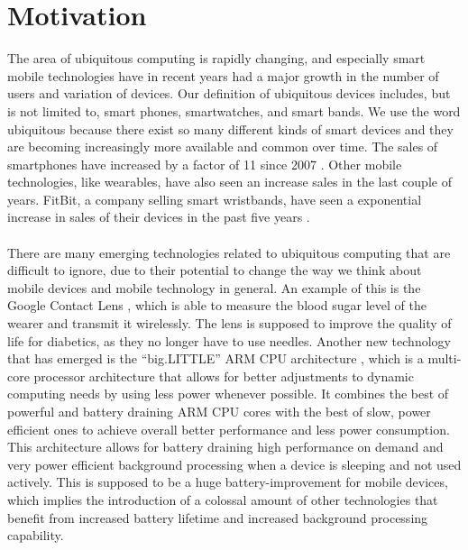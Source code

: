 
\chapter{Motivation}
\label{cha:motivation}

The area of ubiquitous computing is rapidly changing, and especially smart mobile technologies have in recent years had a major growth in the number of users and variation of devices. Our definition of ubiquitous devices includes, but is not limited to, smart phones, smartwatches, and smart bands. We use the word ubiquitous because there exist so many different kinds of smart devices and they are becoming increasingly more available and common over time. The sales of smartphones have increased by a factor of 11 since 2007 \parencite{statsia_smartphones}. Other mobile technologies, like wearables, have also seen an increase sales in the last couple of years. FitBit, a company selling smart wristbands, have seen a exponential increase in sales of their devices in the past five years \parencite{statsia_fitbit}.
\\\\
There are many emerging technologies related to ubiquitous computing that are difficult to ignore, due to their potential to change the way we think about mobile devices and mobile technology in general. An example of this is the Google Contact Lens \parencite{google_contact_lens}, which is able to measure the blood sugar level of the wearer and transmit it wirelessly. The lens is supposed to improve the quality of life for diabetics, as they no longer have to use needles. Another new technology that has emerged is the ``big.LITTLE'' ARM CPU architecture \parencite{big_little_architecture}, which is a multi-core processor architecture that allows for better adjustments to dynamic computing needs by using less power whenever possible. It combines the best of powerful and battery draining ARM CPU cores with the best of slow, power efficient ones to achieve overall better performance and less power consumption. This architecture allows for battery draining high performance on demand and very power efficient background processing when a device is sleeping and not used actively. This is supposed to be a huge battery-improvement for mobile devices, which implies the introduction of a colossal amount of other technologies that benefit from increased battery lifetime and increased background processing capability. 
